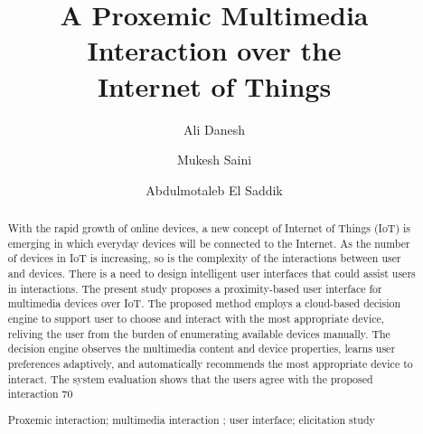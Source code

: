 \documentclass[runningheads,a4paper]{llncs}
\newcommand{\keywords}[1]{\par\addvspace\baselineskip
\noindent\keywordname\enspace\ignorespaces#1}
\begin{document}
\mainmatter  %

\title{A Proxemic Multimedia Interaction over the\\Internet of Things}


%
%
\author{Ali Danesh%
\and Mukesh Saini\and  Abdulmotaleb El Saddik}%


%
%

\maketitle


\begin{abstract}
With the rapid growth of online devices, a new concept of
Internet of Things (IoT) is emerging in which everyday devices will be connected to the Internet. As the number of devices in IoT is increasing, so is the complexity of the interactions between user and devices. There is a need to design intelligent user interfaces that could assist users in interactions. The present study proposes a proximity-based user interface for multimedia devices over IoT. The proposed method employs a cloud-based decision engine to support user to choose and interact with the most appropriate device, reliving the user from the burden of enumerating available devices manually. The decision engine observes the multimedia content and device properties, learns user preferences adaptively, and automatically recommends the most appropriate device to interact. The system evaluation shows that the users agree with the proposed interaction 70%
\keywords{Proxemic interaction; multimedia interaction ; user interface; elicitation study}
\end{abstract}
\end{document}
